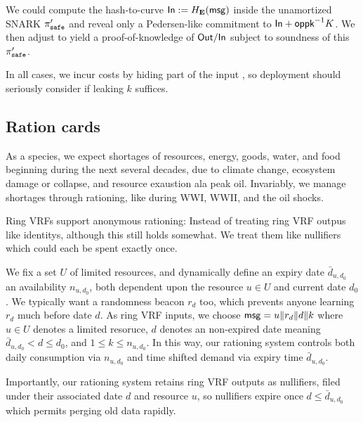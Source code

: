 We could compute the hash-to-curve ${\mathsf{In}} := H_{{\mathbf{E}}}(\mathsf{msg})$ inside the
unamortized SNARK $\pi_{\mathtt{safe}}'$ and reveal only a Pedersen-like commitment
to ${\mathsf{In}} + \mathsf{oppk}^{-1} K$.  We then adjust \PedVRF to yield
a proof-of-knowledge of ${\mathsf{Out}}/{\mathsf{In}}$ subject to soundness of this
$\pi_{\mathtt{safe}}'$.

In all cases, we incur costs by hiding part of the input \msg, so
deployment should seriously consider if leaking $k$ suffices.



\subsection{Ration cards}

As a species, we expect shortages of resources, energy, goods, water,
and food beginning during the next several decades, due to climate change,
ecosystem damage or collapse, and resource exaustion ala peak oil. 
Invariably, we manage shortages through rationing, like during WWI,
WWII, and the oil shocks.  

Ring VRFs support anonymous rationing:
Instead of treating ring VRF outpus like identitys, although
this still holds somewhat.  We treat them like nullifiers which
could each be spent exactly once.

We fix a set $U$ of limited resources, and dynamically define
an expiry date $\bar{d}_{u,d_0}$ an availability $n_{u,d_0}$, 
both dependent upon the resource $u \in U$ and current date $d_0$.
We typically want a randomness beacon $r_d$ too, which prevents
anyone learning $r_d$ much before date $d$. 
As ring VRF inputs, we choose
 $\mathsf{msg} = u \| r_d \| d \| k$
where $u \in U$ denotes a limited resoruce,
 $d$ denotes an non-expired date meaning $\bar{d}_{u,d_0} < d \le d_0$,
 and $1 \le k \le n_{u,d_0}$.
In this way, our rationing system controls both daily consumption
via $n_{u,d_0}$ and time shifted demand via expiry time $\bar{d}_{u,d_0}$.

Importantly, our rationing system retains ring VRF outputs as nullifiers,
filed under their associated date $d$ and resource $u$, so nullifiers
expire once $d \le \bar{d}_{u,d_0}$ which permits perging old data rapidly.


